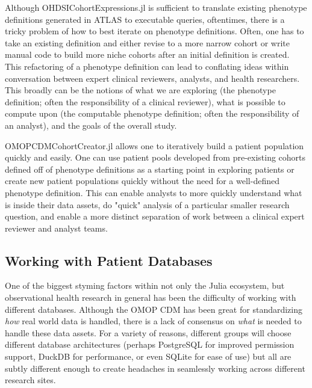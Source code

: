 \documentclass{juliacon}
\begin{document}
Although OHDSICohortExpressions.jl is sufficient to translate existing phenotype definitions generated in ATLAS to executable queries, oftentimes, there is a tricky problem of how to best iterate on phenotype definitions. \cite{zelkoDevelopingRobustComputable2023}
Often, one has to take an existing definition and either revise to a more narrow cohort or write manual code to build more niche cohorts after an initial definition is created.
This refactoring of a phenotype definition can lead to conflating ideas within conversation between expert clinical reviewers, analysts, and health researchers.
This broadly can be the notions of what we are exploring (the phenotype definition; often the responsibility of a clinical reviewer), what is possible to compute upon (the computable phenotype definition; often the responsibility of an analyst), and the goals of the overall study.

OMOPCDMCohortCreator.jl allows one to iteratively build a patient population quickly and easily.
One can use patient pools developed from pre-existing cohorts defined off of phenotype definitions as a starting point in exploring patients or create new patient populations quickly without the need for a well-defined phenotype definition.
This can enable analysts to more quickly understand what is inside their data assets, do "quick" analysis of a particular smaller research question, and enable a more distinct separation of work between a clinical expert reviewer and analyst teams.


\subsection{Working with Patient Databases}

One of the biggest styming factors within not only the Julia ecosystem, but observational health research in general has been the difficulty of working with different databases.
Although the OMOP CDM has been great for standardizing \textit{how} real world data is handled, there is a lack of consensus on \textit{what} is needed to handle these data assets.
For a variety of reasons, different groups will choose different database architectures (perhaps PostgreSQL for improved permission support, DuckDB for performance, or even SQLite for ease of use) but all are subtly different enough to create headaches in seamlessly working across different research sites.
\end{document}
